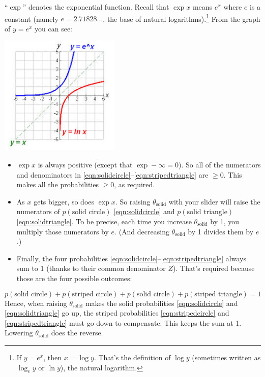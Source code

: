 \documentclass[11pt]{article}
\begin{document}
``$\exp$'' denotes the exponential function.  Recall that $\exp x$ means
$e^x$ where $e$ is a constant (namely $e=2.71828\ldots$, the base of
natural logarithms).\footnote{If $y=e^x$, then $x=\log y$.  That's the
  definition of $\log y$ (sometimes written as $\log_e y$ or $\ln y$),
  the natural logarithm.}  From the graph of $y=e^x$ you can see:

\includegraphics[height=2.25in]{exp}
\begin{minipage}[b]{4in}
\vspace{4pt}
\begin{itemize}

\item $\exp x$ is always positive (except that $\exp
  -\infty=0$).  So all of the numerators and denominators in \eqref{eqn:solidcircle}--\eqref{eqn:stripedtriangle} are
  $\geq 0$.  This makes all the probabilities $\geq 0$, as required.

\item As $x$ gets bigger, so does $\exp x$.  So raising
  $\theta_{\textrm{solid}}$ with your slider will raise the numerators
  of $p(\text{solid circle})$ \eqref{eqn:solidcircle} and $p(\text{solid triangle})$
  \eqref{eqn:solidtriangle}.  To be precise, each time you increase
  $\theta_{\textrm{solid}}$ by 1, you multiply those numerators by
  $e$.  (And decreasing $\theta_{\textrm{solid}}$ by 1 divides them by $e$.)

\item Finally, the four probabilities
  \eqref{eqn:solidcircle}--\eqref{eqn:stripedtriangle} always sum to 1
  (thanks to their common denominator $Z$).  That's required because
  those are the four possible outcomes:
\end{itemize}
\end{minipage}
\vspace{-6pt}
\begin{equation}
  p(\text{solid circle}) + p(\text{striped circle}) + p(\text{solid circle}) + p(\text{striped triangle}) = 1
\end{equation}
Hence, when raising $\theta_{\textrm{solid}}$ makes the solid
probabilities \eqref{eqn:solidcircle} and \eqref{eqn:solidtriangle} go
up, the striped probabilities \eqref{eqn:stripedcircle} and
\eqref{eqn:stripedtriangle} must go down to compensate.  \hspace{-2pt}This keeps the sum at 1.  Lowering $\theta_{\textrm{solid}}$ does the reverse.
\end{document}
